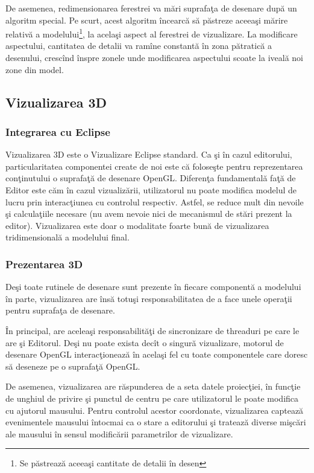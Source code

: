 De asemenea, redimensionarea ferestrei va mări suprafaţa de desenare după un
algoritm special. Pe scurt, acest algoritm încearcă să păstreze aceeaşi mărire
relativă a modelului\footnote{Se păstrează aceeaşi cantitate de detalii în
desen}, la acelaşi aspect al ferestrei de vizualizare. La modificare aspectului,
cantitatea de detalii va ramîne constantă în zona pătratică a desenului,
crescînd înspre zonele unde modificarea aspectului scoate la iveală noi zone din
model.

\subsection{Vizualizarea 3D}
\label{section:impl-view}

\subsubsection{Integrarea cu Eclipse}
Vizualizarea 3D este o Vizualizare Eclipse standard. Ca şi în cazul editorului,
particularitatea componentei create de noi este că foloseşte pentru
reprezentarea conţinutului o suprafaţă de desenare OpenGL. Diferenţa
fundamentală faţă de Editor este căm în cazul vizualizării, utilizatorul nu
poate modifica modelul de lucru prin interacţiunea cu controlul respectiv.
Astfel, se reduce mult din nevoile şi calculaţiile necesare (nu avem nevoie nici
de mecanismul de stări prezent la editor). Vizualizarea este doar o modalitate
foarte bună de vizualizarea tridimensională a modelului final.

\subsubsection{Prezentarea 3D}
Deşi toate rutinele de desenare sunt prezente în fiecare componentă a modelului
în parte, vizualizarea are însă totuşi responsabilitatea de a face unele
operaţii pentru suprafaţa de desenare.

În principal, are aceleaşi responsabilităţi de sincronizare de threaduri pe care
le are şi Editorul. Deşi nu poate exista decît o singură vizualizare, motorul de
desenare OpenGL interacţionează în acelaşi fel cu toate componentele care doresc
să deseneze pe o suprafaţă OpenGL.

De asemenea, vizualizarea are răspunderea de a seta datele proiecţiei, în
funcţie de unghiul de privire şi punctul de centru pe care utilizatorul le poate
modifica cu ajutorul mausului. Pentru controlul acestor coordonate, vizualizarea
captează evenimentele mausului întocmai ca o stare a editorului şi tratează
diverse mişcări ale mausului în sensul modificării parametrilor de vizualizare.

